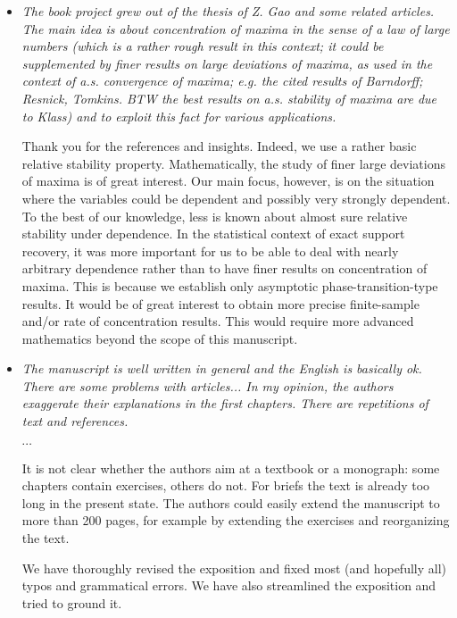 \documentclass[11pt]{article}
\begin{document}
   \begin{itemize}
   
     \item {\em The book project grew out of the thesis of Z. Gao and some related articles. The main idea is about concentration of maxima in the sense of a law of large numbers (which is a rather rough result in this context; it could be supplemented by finer results on large deviations of maxima, as used in the context of a.s. convergence of maxima; e.g. the cited results of Barndorff; Resnick, Tomkins. BTW the best results on a.s. stability of maxima are due to Klass) and to exploit this fact for various applications.
}
     
     Thank you for the references and insights.  
     Indeed, we use a rather basic relative stability property.  Mathematically, the study of finer large deviations of maxima is of great interest.  Our 
     main focus, however, is on the situation where the variables could be dependent and possibly very strongly dependent.  To the best of our knowledge, 
     less is known about almost sure relative stability under dependence.  In the statistical context of exact support recovery, it was more important for us 
     to be able to deal with nearly arbitrary dependence rather than to have finer results on concentration of maxima.  This is because we establish only
     asymptotic phase-transition-type results.  It would be of great interest to obtain more precise finite-sample 
     and/or rate of concentration results. This would require more advanced mathematics beyond the scope of this manuscript.
     
     \item {\em The manuscript is well written in general and the English is basically ok. There are some problems with articles... In my opinion, the authors exaggerate their explanations in the first chapters. There are repetitions of text and references.
     
     \centerline{$\cdots$}
     
     It is not clear whether the authors aim at a textbook or a monograph: some chapters contain exercises, others do not. For briefs the text is already too long in the present state. The authors could easily extend the manuscript to more than 200 pages, for example by extending the exercises and reorganizing the text.}
     
     We have thoroughly revised the exposition and fixed most (and hopefully all) typos and grammatical errors.  We have also streamlined the exposition 
     and tried to ground it.
     

\end{itemize}
\end{document}
